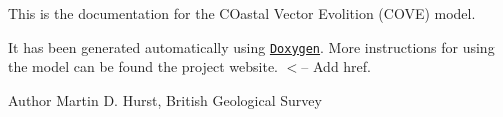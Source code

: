 This is the documentation for the C\-Oastal Vector Evolition (C\-O\-V\-E) model.



It has been generated automatically using \href{http://www.stack.nl/~dimitri/doxygen/}{\tt Doxygen}. More instructions for using the model can be found the project website. $<$-- Add href.

\begin{DoxyAuthor}{Author}
Martin D. Hurst, British Geological Survey 
\end{DoxyAuthor}
